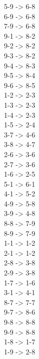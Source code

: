 5-9     ->  6-8\\
6-9     ->  6-8\\
7-9     ->  6-8\\
9-1     ->  8-2\\
9-2     ->  8-2\\
9-3     ->  8-2\\
9-4     ->  8-3\\
9-5     ->  8-4\\
9-6     ->  8-5\\
1-2     ->  2-3\\
1-3     ->  2-3\\
1-4     ->  2-3\\
1-5     ->  2-4\\
3-7     ->  4-6\\
3-8     ->  4-7\\
2-6     ->  3-6\\
2-7     ->  3-6\\
1-6     ->  2-5\\
5-1     ->  6-1\\
4-1     ->  5-2\\
4-9     ->  5-8\\
3-9     ->  4-8\\
8-8     ->  7-9\\
8-9     ->  7-9\\
1-1     ->  1-2\\
2-1     ->  1-2\\
2-8     ->  3-8\\
2-9     ->  3-8\\
1-7     ->  1-6\\
3-1     ->  4-1\\
8-7     ->  7-7\\
9-7     ->  8-6\\
9-8     ->  8-8\\
9-9     ->  8-8\\
1-8     ->  1-7\\
1-9     ->  2-8\\